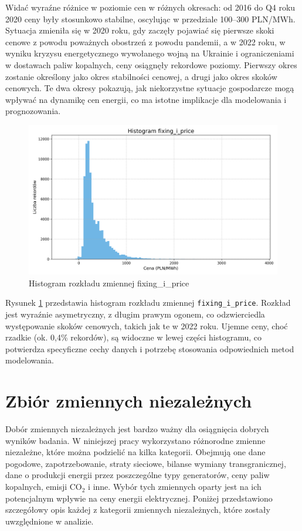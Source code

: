 Widać wyraźne różnice w poziomie cen w różnych okresach: od 2016 do Q4 roku 2020 ceny były stosunkowo stabilne, oscylując w przedziale 100–300 PLN/MWh. Sytuacja zmieniła się w 2020 roku, gdy zaczęły pojawiać się pierwsze skoki cenowe z powodu poważnych obostrzeń z powodu pandemii, a w 2022 roku, w wyniku kryzysu energetycznego wywołanego wojną na Ukrainie i ograniczeniami w dostawach paliw kopalnych, ceny osiągnęły rekordowe poziomy. Pierwszy okres zostanie określony jako okres stabilności cenowej, a drugi jako okres skoków cenowych. Te dwa okresy pokazują, jak niekorzystne sytuacje gospodarcze mogą wpływać na dynamikę cen energii, co ma istotne implikacje dla modelowania i prognozowania.

\begin{figure}
    \centering
    \includegraphics[width=\textwidth]{../plots/data/histogram_fixing_i_price.png}
    \caption{Histogram rozkładu zmiennej fixing\_i\_price}
    \label{fig:fixing-i-price-histogram}
\end{figure}

Rysunek \ref{fig:fixing-i-price-histogram} przedstawia histogram rozkładu zmiennej \texttt{fixing\_i\_price}. Rozkład jest wyraźnie asymetryczny, z długim prawym ogonem, co odzwierciedla występowanie skoków cenowych, takich jak te w 2022 roku. Ujemne ceny, choć rzadkie (ok. 0,4\% rekordów), są widoczne w lewej części histogramu, co potwierdza specyficzne cechy danych i potrzebę stosowania odpowiednich metod modelowania.

\section{Zbiór zmiennych niezależnych}
Dobór zmiennych niezależnych jest bardzo ważny dla osiągnięcia dobrych wyników badania. W niniejszej pracy wykorzystano różnorodne zmienne niezależne, które można podzielić na kilka kategorii. Obejmują one dane pogodowe, zapotrzebowanie, straty sieciowe, bilanse wymiany transgranicznej, dane o produkcji energii przez poszczególne typy generatorów, ceny paliw kopalnych, emisji CO$_2$ i inne. Wybór tych zmiennych oparty jest na ich potencjalnym wpływie na ceny energii elektrycznej. Poniżej przedstawiono szczegółowy opis każdej z kategorii zmiennych niezależnych, które zostały uwzględnione w analizie.

